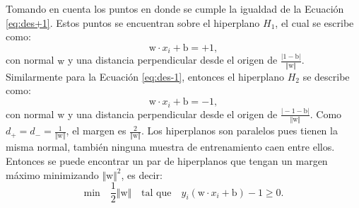 Tomando en cuenta los puntos en donde se cumple la igualdad de la Ecuación \ref{eq:des+1}. Estos puntos se encuentran sobre el hiperplano $H_1$, el cual se escribe como: 
\begin{equation}\label{eq:eq+1}
\text{w} \cdot x_i + \text{b} = +1,  
\end{equation} 
con normal $\text{w}$ y una distancia perpendicular desde el origen de $\frac{\vert 1-\text{b} \vert}{ \Vert \text{w} \Vert}$. 
Similarmente para la Ecuación \ref{eq:des-1}, entonces el hiperplano $H_2$ se describe como: 
\begin{equation}\label{eq:eq+1}
\text{w} \cdot x_i + \text{b} = -1,  
\end{equation} 
con normal $\text{w}$ y una distancia perpendicular desde el origen de $\frac{\vert-1-\text{b}\vert}{ \Vert \text{w} \Vert}$.
Como $d_+ = d_- = \frac{1}{\Vert \text{w} \Vert}$, el margen es $\frac{2}{\Vert \text{w} \Vert}$. Los hiperplanos son paralelos pues tienen la misma normal, también ninguna muestra de entrenamiento caen entre ellos. Entonces se puede encontrar un par de hiperplanos  que tengan un margen máximo minimizando $\Vert \text{w} \Vert^2$, es decir:  
\begin{equation}
\text{min} \quad \frac{1}{2} \Vert \text{w} \Vert \quad \text{tal que} \quad y_i(\text{w} \cdot x_i + \text{b}) -1 \geq 0.
\end{equation}  


\newpage
